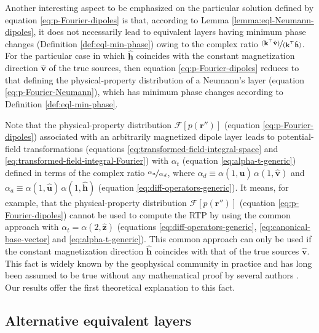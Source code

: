 Another interesting aspect to be emphasized on the particular solution defined by equation \ref{eq:p-Fourier-dipoles} is that,
according to Lemma \ref{lemma:eql-Neumann-dipoles}, it 
does not necessarily lead to equivalent layers having minimum phase changes (Definition \ref{def:eql-min-phase}) owing to the complex ratio 
$\nicefrac{(\mathbf{k}^{\top} \hat{\mathbf{v}})}{(\mathbf{k}^{\top} \hat{\mathbf{h}})}$.
For the particular case in which $\hat{\mathbf{h}}$ coincides with the constant magnetization direction $\hat{\mathbf{v}}$ of the true sources,
then equation \ref{eq:p-Fourier-dipoles} reduces to that defining the physical-property distribution of a Neumann's layer 
(equation \ref{eq:p-Fourier-Neumann}), which has minimum phase changes according to Definition \ref{def:eql-min-phase}.

Note that the physical-property distribution $\mathcal{F} [ p(\mathbf{r}'') ]$ (equation \ref{eq:p-Fourier-dipoles}) associated 
with an arbitrarily magnetized dipole layer leads to potential-field transformations (equations 
\ref{eq:transformed-field-integral-space} and \ref{eq:transformed-field-integral-Fourier}) with 
$\alpha_{t}$ (equation \ref{eq:alpha-t-generic}) defined in terms of the complex ratio 
$\nicefrac{\alpha_{a}}{\alpha_{d}}$, where 
$\alpha_{d} \equiv \alpha(1, \hat{\mathbf{u}}) \, \alpha(1, \hat{\mathbf{v}})$ and 
$\alpha_{a} \equiv \alpha(1, \hat{\mathbf{u}}) \, \alpha(1, \hat{\mathbf{h}})$ 
(equation \ref{eq:diff-operators-generic}).
It means, for example, that the physical-property distribution $\mathcal{F} [ p(\mathbf{r}'') ]$ (equation \ref{eq:p-Fourier-dipoles}) 
cannot be used to compute the RTP by using the common approach with $\alpha_{t} = \alpha(2, \hat{\mathbf{z}})$ 
(equations \ref{eq:diff-operators-generic}, \ref{eq:canonical-base-vector} and \ref{eq:alpha-t-generic}).
This common approach can only be used if the constant magnetization direction $\hat{\mathbf{h}}$ coincides with 
that of the true sources $\hat{\mathbf{v}}$.
This fact is widely known by the geophysical community in practice and has long been assumed to be true
without any mathematical proof by several authors 
\citep[e.g., ][]{silva1986, leao-silva_1989, guspi_novara2009, oliveirajr_etal2013, takahashi-etal2022}. 
Our results offer the first theoretical explanation to this fact.

\subsection{Alternative equivalent layers}

